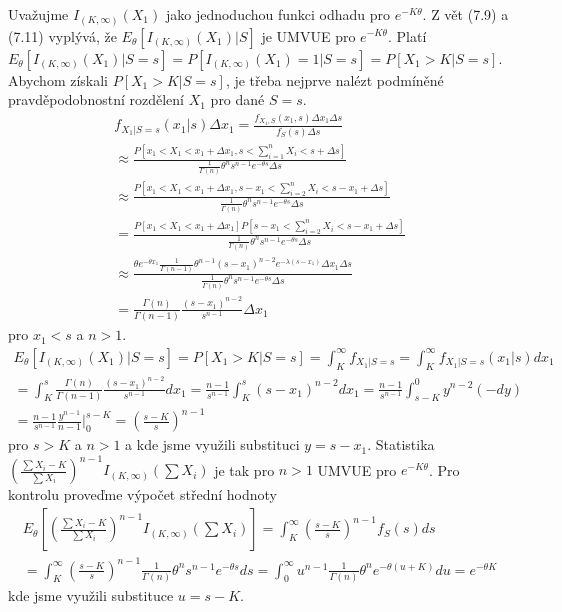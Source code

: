 \begin{example}
Uvažujme $I_{(K, \infty)}(X_1)$ jako jednoduchou funkci odhadu pro $e^{-K \theta}$. Z vět (7.9) a (7.11) vyplývá, že $E_{\theta}[I_{(K,  \infty)}(X_1)|S]$ je UMVUE pro $e^{-K \theta}$. Platí $E_{\theta}[I_{(K, \infty)}(X_1)|S = s] = P[I_{(K, \infty)}(X_1) = 1|S = s] = P[X_1 > K | S = s]$. Abychom získali $P[X_1 > K | S = s]$, je třeba nejprve nalézt podmíněné pravděpodobnostní rozdělení $X_1$ pro dané $S = s$.
\begin{gather*}
f_{X_1|S = s}(x_1|s)\Delta x_1 = \frac{f_{X_1, S}(x_1, s)\Delta x_1 \Delta s}{f_S(s)\Delta s}\\
\approx \frac{P \left[x_1 < X_1 < x_1 + \Delta x_1, s < \sum_{i = 1}^n X_i < s + \Delta s \right]}{\frac{1}{\Gamma(n)}\theta^n s^{n-1}e^{-\theta s}\Delta s}\\
\approx \frac{P \left[x_1 < X_1 < x_1 + \Delta x_1, s - x_1 < \sum_{i = 2}^n X_i < s - x_1 + \Delta s \right]}{\frac{1}{\Gamma(n)}\theta^n s^{n-1}e^{-\theta s}\Delta s}\\
= \frac{P[x_1 < X_1 < x_1 + \Delta x_1]P\left[s - x_1 < \sum_{i = 2}^n X_i < s - x_1 + \Delta s \right]}{\frac{1}{\Gamma(n)}\theta^n s^{n-1}e^{-\theta s}\Delta s}\\
\approx \frac{\theta e^{-\theta x_1}\frac{1}{\Gamma(n - 1)}\theta^{n - 1}(s - x_1)^{n - 2}e^{-\lambda(s - x_1)}\Delta x_1 \Delta s}{\frac{1}{\Gamma(n)}\theta^n s^{n-1}e^{-\theta s}\Delta s}\\
= \frac{\Gamma(n)}{\Gamma(n - 1)}\frac{(s - x_1)^{n - 2}}{s^{n - 1}}\Delta x_1
\end{gather*}
pro $x_1 < s$ a $n > 1$.
\begin{gather*}
E_{\theta}[I_{(K, \infty)}(X_1)|S = s] = P[X_1 > K | S = s] = \int_K^{\infty} f_{X_1|S = s} = \int_K^{\infty}f_{X_1|S = s}(x_1|s)dx_1\\
= \int_K^s \frac{\Gamma(n)}{\Gamma(n - 1)} \frac{(s - x_1)^{n - 2}}{s^{n - 1}}d x_1 = \frac{n - 1}{s^{n - 1}} \int_K^s (s - x_1)^{n - 2} d x_1 = \frac{n - 1}{s^{n - 1}}\int_{s - K}^0 y^{n - 2}(-dy)\\
= \frac{n - 1}{s^{n - 1}}\frac{y^{n - 1}}{n - 1}\Big|_0^{s - K} = \left(\frac{s - K}{s}\right)^{n - 1}
\end{gather*}
pro $s > K$ a $n > 1$ a kde jsme využili substituci $y = s - x_1$. Statistika $\left(\frac{\sum X_i - K}{\sum X_i}\right)^{n - 1}I_{(K, \infty)}\left(\sum X_i\right)$ je tak pro $n > 1$ UMVUE pro $e^{-K \theta}$. Pro kontrolu proveďme výpočet střední hodnoty
\begin{gather*}
E_{\theta}\left[\left(\frac{\sum X_i - K}{\sum X_i}\right)^{n - 1}I_{(K, \infty)}\left(\sum X_i\right)\right] = \int_K^{\infty}\left(\frac{s - K}{s}\right)^{n - 1}f_S(s)ds\\
= \int_K^{\infty}\left(\frac{s - K}{s}\right)^{n - 1}\frac{1}{\Gamma(n)}\theta^n s^{n-1}e^{-\theta s}ds = \int_0^{\infty}u^{n - 1}\frac{1}{\Gamma(n)}\theta^n e^{-\theta(u + K)}du = e^{-\theta K}
\end{gather*}
kde jsme využili substituce $u = s - K$.
\end{example}

